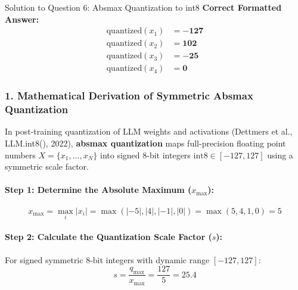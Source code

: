 \documentclass[11pt,a4paper]{article}
\begin{document}
\begin{solutionbox}{Solution to Question 6: Absmax Quantization to int8}
\textbf{Correct Formatted Answer:}
\begin{align*}
    \text{quantized}(x_1) &= \mathbf{-127} \\
    \text{quantized}(x_2) &= \mathbf{102} \\
    \text{quantized}(x_3) &= \mathbf{-25} \\
    \text{quantized}(x_4) &= \mathbf{0}
\end{align*}

\subsubsection*{1. Mathematical Derivation of Symmetric Absmax Quantization}
In post-training quantization of LLM weights and activations (Dettmers et al., LLM.int8(), 2022), \textbf{absmax quantization} maps full-precision floating point numbers $X = \{x_1, \dots, x_N\}$ into signed 8-bit integers $\text{int8} \in [-127, 127]$ using a symmetric scale factor.

\paragraph{Step 1: Determine the Absolute Maximum ($x_{\text{max}}$):}
\begin{equation}
    x_{\text{max}} = \max_{i} |x_i| = \max(|-5|, |4|, |-1|, |0|) = \max(5, 4, 1, 0) = 5
\end{equation}

\paragraph{Step 2: Calculate the Quantization Scale Factor ($s$):}
For signed symmetric 8-bit integers with dynamic range $[-127, 127]$:
\begin{equation}
    s = \frac{q_{\text{max}}}{x_{\text{max}}} = \frac{127}{5} = 25.4
\end{equation}


\end{solutionbox}
\end{document}
